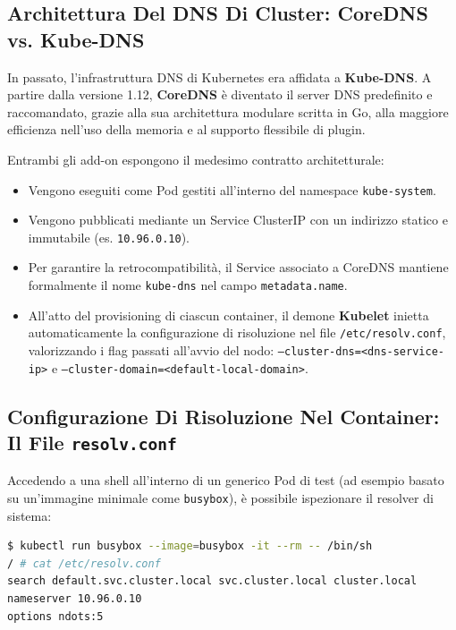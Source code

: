 \documentclass[11pt, a4paper]{article}
\begin{document}
\subsection{Architettura Del DNS Di Cluster: CoreDNS vs. Kube-DNS}
In passato, l'infrastruttura DNS di Kubernetes era affidata a \textbf{Kube-DNS}. A partire dalla versione 1.12, \textbf{CoreDNS} è diventato il server DNS predefinito e raccomandato, grazie alla sua architettura modulare scritta in Go, alla maggiore efficienza nell'uso della memoria e al supporto flessibile di plugin.

Entrambi gli add-on espongono il medesimo contratto architetturale:
\begin{itemize}[noitemsep]
    \item Vengono eseguiti come Pod gestiti all'interno del namespace \texttt{kube-system}.
    \item Vengono pubblicati mediante un Service ClusterIP con un indirizzo statico e immutabile (es. \texttt{10.96.0.10}).
    \item Per garantire la retrocompatibilità, il Service associato a CoreDNS mantiene formalmente il nome \texttt{kube-dns} nel campo \texttt{metadata.name}.
    \item All'atto del provisioning di ciascun container, il demone \textbf{Kubelet} inietta automaticamente la configurazione di risoluzione nel file \texttt{/etc/resolv.conf}, valorizzando i flag passati all'avvio del nodo: \texttt{--cluster-dns=<dns-service-ip>} e \texttt{--cluster-domain=<default-local-domain>}.
\end{itemize}

\subsection{Configurazione Di Risoluzione Nel Container: Il File \texttt{resolv.conf}}
Accedendo a una shell all'interno di un generico Pod di test (ad esempio basato su un'immagine minimale come \texttt{busybox}), è possibile ispezionare il resolver di sistema:

\begin{lstlisting}[language=bash]
$ kubectl run busybox --image=busybox -it --rm -- /bin/sh
/ # cat /etc/resolv.conf
search default.svc.cluster.local svc.cluster.local cluster.local
nameserver 10.96.0.10
options ndots:5
\end{lstlisting}
\end{document}
